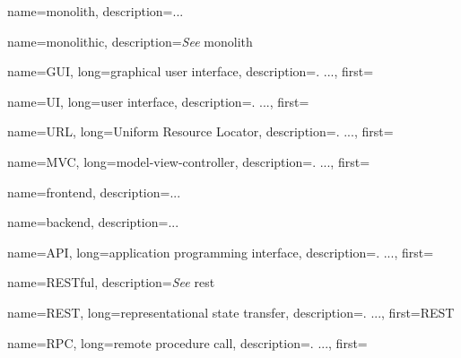 




{
    name=monolith,
    description={...} %
}
    
{
    name=monolithic,
    description={\textit{See} \gls{monolith}}
}
    
{
    name=GUI,
    long={graphical user interface},
    description={. ...},%
    first=
}

{
    name=UI,
    long={user interface},
    description={. ...},%
    first=
}

{
    name=URL,
    long={Uniform Resource Locator},
    description={. ...},%
    first=
}

{
    name=MVC,
    long={model-view-controller},
    description={. ...},
    first=
}

{
    name=frontend,
    description={...} %
}

{
    name=backend,
    description={...} %
}

{
    name=API,
    long={application programming interface},
    description={. ...},%
    first=
}

{
    name=RESTful,
    description={\textit{See} \gls{rest}}
}

{
    name=REST,
    long={representational state transfer},
    description={. ...},%
    first=REST %
}

{
    name=RPC,
    long={remote procedure call},
    description={. ...},%
    first= %
}

